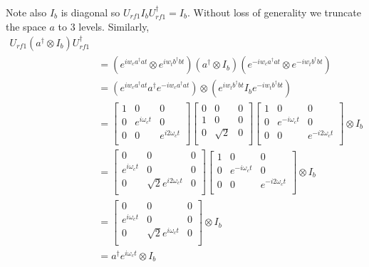 \documentclass[letterpaper, 12pt]{article}
\begin{document}
Note also $I_{b}$ is diagonal so $U_{rf1} I_{b} U_{rf1}^{\dagger} = I_{b}$.
Without loss of generality we truncate the space $a$ to 3 levels.
Similarly,
\begin{align*}
    U_{rf1}(a^{\dagger} \otimes I_{b})U_{rf1}^{\dagger}\\
  &= (e^{iw_{c}a^{\dagger}at} \otimes e^{iw_{t}b^{\dagger}bt})(a^{\dagger} \otimes I_{b})(e^{-iw_{c}a^{\dagger}at} \otimes e^{-iw_{t}b^{\dagger}bt}) \\
  &= (e^{iw_{c}a^{\dagger}at}a^{\dagger}e^{-iw_{c}a^{\dagger}at}) \otimes (e^{iw_{t}b^{\dagger}bt}I_{b}e^{-iw_{t}b^{\dagger}bt})\\
  &=\left[{\begin{array}{ccc}
        1 & 0           & 0 \\
        0 & e^{i\omega_{c}t} & 0 \\
        0 & 0           & e^{i2\omega_{c}t}\\
    \end{array}} \right]
  \left[{\begin{array}{ccc}
      0 & 0        & 0 \\
      1 & 0        & 0 \\
      0 & \sqrt{2} & 0 \\
      \end{array}}\right]
  \left[{\begin{array}{ccc}
        1 & 0            & 0 \\
        0 & e^{-i\omega_{c}t} & 0\\
        0 & 0            & e^{-i2\omega_{c}t}\\
    \end{array}}\right]
  \otimes I_{b} \\
  &=\left[{\begin{array}{ccc}
        0 &                0          & 0 \\
        e^{i\omega_{c}t} & 0          & 0 \\
        0 & \sqrt{2}e^{i2\omega_{c}t} & 0\\
    \end{array}} \right]
  \left[{\begin{array}{ccc}
        1 & 0           & 0 \\
        0 & e^{-i\omega_{c}t} & 0 \\
        0 & 0           & e^{-i2\omega_{c}t}\\
    \end{array}} \right]
  \otimes I_{b}\\
    &=\left[{\begin{array}{ccc}
        0                & 0                        & 0\\
        e^{i\omega_{c}t} & 0                        & 0\\
        0                & \sqrt{2}e^{i\omega_{c}t} & 0\\
    \end{array}} \right]
  \otimes I_{b}\\
  &= a^{\dagger}e^{i\omega_{c}t} \otimes I_{b}\\
\end{align*}
\end{document}
